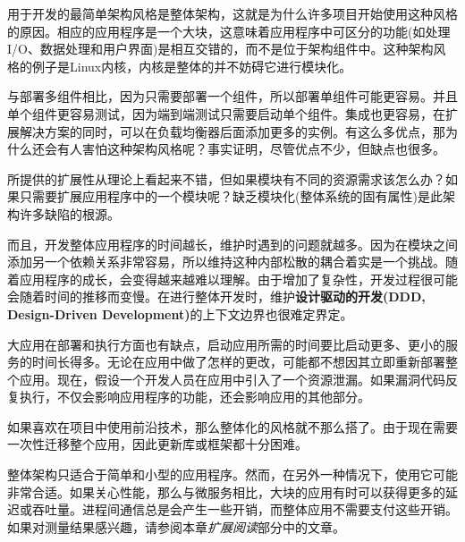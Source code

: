 用于开发的最简单架构风格是整体架构，这就是为什么许多项目开始使用这种风格的原因。相应的应用程序是一个大块，这意味着应用程序中可区分的功能(如处理I/O、数据处理和用户界面)是相互交错的，而不是位于架构组件中。这种架构风格的例子是Linux内核，内核是整体的并不妨碍它进行模块化。

与部署多组件相比，因为只需要部署一个组件，所以部署单组件可能更容易。并且单个组件更容易测试，因为端到端测试只需要启动单个组件。集成也更容易，在扩展解决方案的同时，可以在负载均衡器后面添加更多的实例。有这么多优点，那为什么还会有人害怕这种架构风格呢？事实证明，尽管优点不少，但缺点也很多。

所提供的扩展性从理论上看起来不错，但如果模块有不同的资源需求该怎么办？如果只需要扩展应用程序中的一个模块呢？缺乏模块化(整体系统的固有属性)是此架构许多缺陷的根源。

而且，开发整体应用程序的时间越长，维护时遇到的问题就越多。因为在模块之间添加另一个依赖关系非常容易，所以维持这种内部松散的耦合着实是一个挑战。随着应用程序的成长，会变得越来越难以理解。由于增加了复杂性，开发过程很可能会随着时间的推移而变慢。在进行整体开发时，维护\textbf{设计驱动的开发(DDD, Design-Driven Development)}的上下文边界也很难定界定。

大应用在部署和执行方面也有缺点，启动应用所需的时间要比启动更多、更小的服务的时间长得多。无论在应用中做了怎样的更改，可能都不想因其立即重新部署整个应用。现在，假设一个开发人员在应用中引入了一个资源泄漏。如果漏洞代码反复执行，不仅会影响应用程序的功能，还会影响应用的其他部分。

如果喜欢在项目中使用前沿技术，那么整体化的风格就不那么搭了。由于现在需要一次性迁移整个应用，因此更新库或框架都十分困难。

整体架构只适合于简单和小型的应用程序。然而，在另外一种情况下，使用它可能非常合适。如果关心性能，那么与微服务相比，大块的应用有时可以获得更多的延迟或吞吐量。进程间通信总是会产生一些开销，而整体应用不需要支付这些开销。如果对测量结果感兴趣，请参阅本章\textit{扩展阅读}部分中的文章。






















